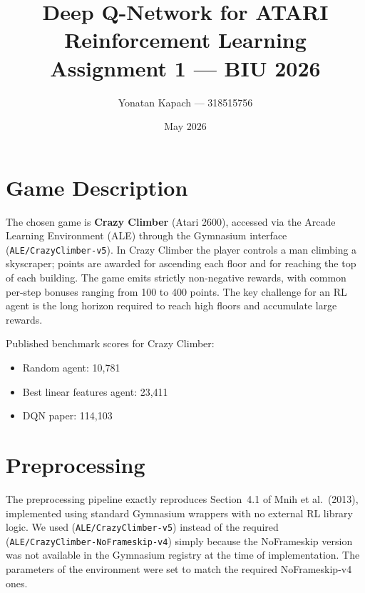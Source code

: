 \documentclass[11pt,a4paper]{article}
\title{\textbf{Deep Q-Network for ATARI}\\[0.5em]
       \large Reinforcement Learning Assignment 1 --- BIU 2026}
\author{Yonatan Kapach --- 318515756}
\date{May 2026}
\begin{document}
\maketitle
\tableofcontents
\newpage

\section{Game Description}

The chosen game is \textbf{Crazy Climber} (Atari 2600), accessed via the
Arcade Learning Environment (ALE) through the Gymnasium interface
(\texttt{ALE/CrazyClimber-v5}).
In Crazy Climber the player controls a man climbing a skyscraper; points
are awarded for ascending each floor and for reaching the top of each
building.
The game emits strictly non-negative rewards, with common per-step bonuses
ranging from 100 to 400 points.
The key challenge for an RL agent is the long horizon required to reach
high floors and accumulate large rewards.

Published benchmark scores for Crazy Climber:
\begin{itemize}
  \item Random agent: 10{,}781
  \item Best linear features agent: 23{,}411
  \item DQN paper: 114{,}103
\end{itemize}

\section{Preprocessing}

The preprocessing pipeline exactly reproduces Section~4.1 of Mnih et al.\
(2013), implemented using standard Gymnasium wrappers with no external RL
library logic. We used (\texttt{ALE/CrazyClimber-v5}) instead of the required (\texttt{ALE/CrazyClimber-NoFrameskip-v4})
simply because the NoFrameskip version was not available in the Gymnasium registry at the time of implementation. The
parameters of the environment were set to match the required NoFrameskip-v4 ones. 
\end{document}
